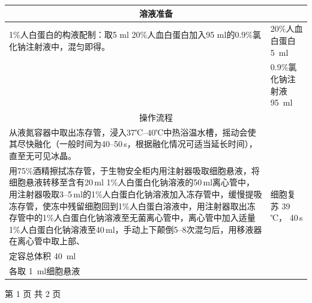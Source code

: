 \documentclass[UTF8,10pt,a4paper,fontset=fandol]{ctexart}
\newcommand{\fieldvalue}[1]{#1}
\newcommand{\handwritten}[1]{#1}
\begin{document}
\begin{center}
\begin{center}
\begin{tabularx}{\textwidth}{|p{}|X|}
\hline
\multicolumn{2}{|c|}{溶液准备}\\
\hline
1\%人白蛋白的构液配制：取5 ml 20\%人血白蛋白加入95 ml的0.9\%氯化钠注射液中，混匀即得。 &
20\%人血白蛋白\quad
\fieldvalue{\handwritten{5}}\ ml\\
& 0.9\%氯化钠注射液\quad
\fieldvalue{\handwritten{95}}\ ml\\
\hline
\multicolumn{2}{|c|}{操作流程}\\
\hline
从液氮容器中取出冻存管，浸入37℃--40℃中热浴温水槽，摇动会使其尽快融化（一般时间为40--50\,s，根据融化情况可适当延长时间），直至无可见冰晶。\\
用75\%酒精擦拭冻存管，于生物安全柜内用注射器吸取细胞悬液，将细胞悬液转移至含有20\,ml 1\%人白蛋白化钠溶液的50\,ml离心管中，用注射器吸取3--5\,ml的1\%人白蛋白化钠溶液加入冻存管中，缓慢提吸冻存管，使冻中残留细胞回到1\%人白蛋白溶液中，用注射器取出冻存管中的1\%人白蛋白化钠溶液至无菌离心管中，离心管中加入适量1\%人白蛋白化钠溶液至40\,ml，手动上下颠倒5--8次混匀后，用移液器在离心管中取上部、 &
细胞复苏
\fieldvalue{\handwritten{39}}\,℃，
\fieldvalue{\handwritten{40}}\,s\\[4pt]
定容总体积
\fieldvalue{\handwritten{40}}\ ml\\[4pt]
各取
\fieldvalue{\handwritten{1}}\ ml细胞悬液\\
\hline
\end{tabularx}

\begin{center}
第 1 页 共 2 页
\end{center}

\newpage


\end{center}
\end{center}
\end{document}
